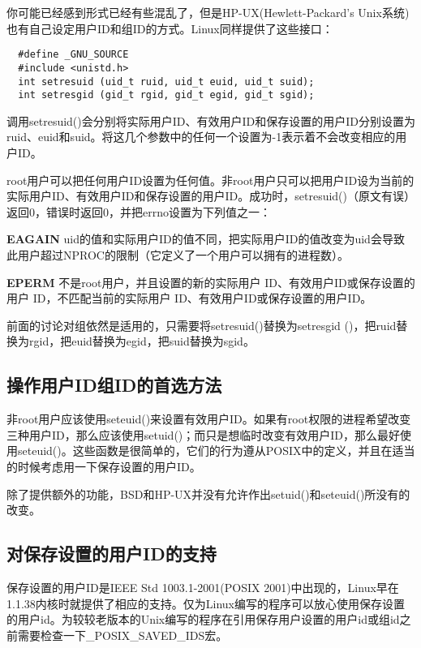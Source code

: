 你可能已经感到形式已经有些混乱了，但是HP-UX(Hewlett-Packard’s Unix系统)也有自己设定用户ID和组ID的方式。Linux同样提供了这些接口：

\begin{lstlisting}
  #define _GNU_SOURCE
  #include <unistd.h>
  int setresuid (uid_t ruid, uid_t euid, uid_t suid);
  int setresgid (gid_t rgid, gid_t egid, gid_t sgid);
\end{lstlisting}

调用setresuid()会分别将实际用户ID、有效用户ID和保存设置的用户ID分别设置为ruid、euid和suid。将这几个参数中的任何一个设置为-1表示着不会改变相应的用户ID。

root用户可以把任何用户ID设置为任何值。非root用户只可以把用户ID设为当前的实际用户ID、有效用户ID和保存设置的用户ID。成功时，setresuid()（原文有误）返回0，错误时返回0，并把errno设置为下列值之一：

\begin{eqlist*}
\item[\textbf{EAGAIN}] uid的值和实际用户ID的值不同，把实际用户ID的值改变为uid会导致此用户超过NPROC的限制（它定义了一个用户可以拥有的进程数）。
\item[\textbf{EPERM}] 不是root用户，并且设置的新的实际用户 ID、有效用户ID或保存设置的用户 ID，不匹配当前的实际用户 ID、有效用户ID或保存设置的用户ID。
\end{eqlist*}

前面的讨论对组依然是适用的，只需要将setresuid()替换为setresgid ()，把ruid替换为rgid，把euid替换为egid，把suid替换为sgid。

\subsection{操作用户ID组ID的首选方法}

非root用户应该使用seteuid()来设置有效用户ID。如果有root权限的进程希望改变三种用户ID，那么应该使用setuid()；而只是想临时改变有效用户ID，那么最好使用seteuid()。这些函数是很简单的，它们的行为遵从POSIX中的定义，并且在适当的时候考虑用一下保存设置的用户ID。

除了提供额外的功能，BSD和HP-UX并没有允许作出setuid()和seteuid()所没有的改变。

\subsection{对保存设置的用户ID的支持}

保存设置的用户ID是IEEE Std 1003.1-2001(POSIX 2001)中出现的，Linux早在1.1.38内核时就提供了相应的支持。仅为Linux编写的程序可以放心使用保存设置的用户id。为较较老版本的Unix编写的程序在引用保存用户设置的用户id或组id之前需要检查一下\_POSIX\_SAVED\_IDS宏。

